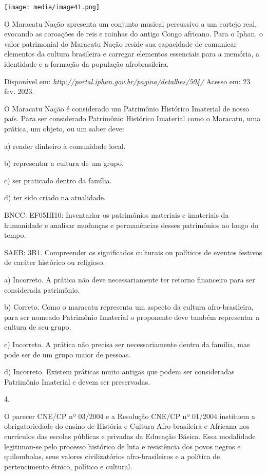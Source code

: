 \texttt{[image: media/image41.png]}

O Maracatu Nação apresenta um conjunto musical percussivo a um cortejo
real, evocando as coroações de reis e rainhas do antigo Congo africano.
Para o Iphan, o valor patrimonial do Maracatu Nação reside sua
capacidade de comunicar elementos da cultura brasileira e carregar
elementos essenciais para a memória, a identidade e a formação da
população afrobrasileira.

Disponível em:
\href{http://portal.iphan.gov.br/pagina/detalhes/504/}{\emph{http://portal.iphan.gov.br/pagina/detalhes/504/}}
Acesso em: 23 fev. 2023.

O Maracatu Nação é considerado um Patrimônio Histórico Imaterial de
nosso país. Para ser considerado Patrimônio Histórico Imaterial como o
Maracatu, uma prática, um objeto, ou um saber deve:

a) render dinheiro à comunidade local.

b) representar a cultura de um grupo.

c) ser praticado dentro da família.

d) ter sido criado na atualidade.

BNCC: EF05HI10: Inventariar os patrimônios materiais e imateriais da
humanidade e analisar mudanças e permanências desses patrimônios ao
longo do tempo.

SAEB: 3B1. Compreender os significados culturais ou políticos de eventos
festivos de caráter histórico ou religioso.

a) Incorreto. A prática não deve necessariamente ter retorno financeiro
para ser considerada patrimônio.

b) Correto. Como o maracatu representa um aspecto da cultura
afro-brasileira, para ser nomeado Patrimônio Imaterial o proponente deve
também representar a cultura de seu grupo.

c) Incorreto. A prática não precisa ser necessariamente dentro da
família, mas pode ser de um grupo maior de pessoas.

d) Incorreto. Existem práticas muito antigas que podem ser consideradas
Patrimônio Imaterial e devem ser preservadas.

4.

O parecer CNE/CP nº 03/2004 e a Resolução CNE/CP nº 01/2004 instituem a
obrigatoriedade do ensino de História e Cultura Afro-brasileira e
Africana nos currículos das escolas públicas e privadas da Educação
Básica. Essa modalidade legitimou-se pelo processo histórico de luta e
resistência dos povos negros e quilombolas, seus valores civilizatórios
afro-brasileiros e a política de pertencimento étnico, político e
cultural.

